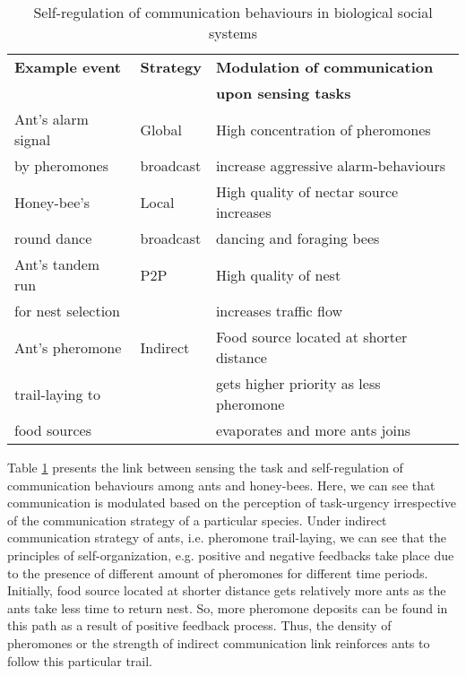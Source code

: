 \documentclass{intech}
\begin{document}
\begin{table}[htp]
\caption{Self-regulation of communication behaviours in biological social systems}
\label{table:bio-comm-task-urgency}
\begin{center}
\begin{tabular}{|l|l|l|}
\hline \textbf{Example event} & \textbf{Strategy} & \textbf{Modulation of communication}\\
&  &  \textbf{upon sensing tasks}\\
\hline Ant's alarm signal &  Global  & High concentration of pheromones\\
by pheromones & broadcast &  increase aggressive alarm-behaviours \\                                                                                                                                               
\hline Honey-bee's  & Local  &  High quality of nectar source increases \\
round dance & broadcast & dancing and foraging bees\\
\hline Ant's tandem run     & P2P & High quality of nest \\
for nest selection & &   increases traffic flow\\
\hline Ant's pheromone   & Indirect & Food source located at shorter distance\\
trail-laying to   & &  gets higher priority as less pheromone \\
food sources & & evaporates and more ants joins\\
\hline
\end{tabular}
\end{center}
\end{table}
Table \ref{table:bio-comm-task-urgency} presents the link between sensing the task and self-regulation of communication behaviours among ants and honey-bees. Here, we can see that communication is modulated based on the perception of  task-urgency irrespective of the communication strategy of a particular species. Under indirect communication strategy of ants, i.e. pheromone trail-laying, we can see that the principles of self-organization, e.g. positive and negative feedbacks take place due to the presence of different amount of pheromones for different time periods. Initially, food source located at shorter distance gets relatively more ants  as the ants take less time to return nest. So, more pheromone deposits can be found in this path as a result of positive feedback process.  Thus, the density of pheromones or the strength of indirect communication link reinforces ants to follow this particular trail.
\end{document}
